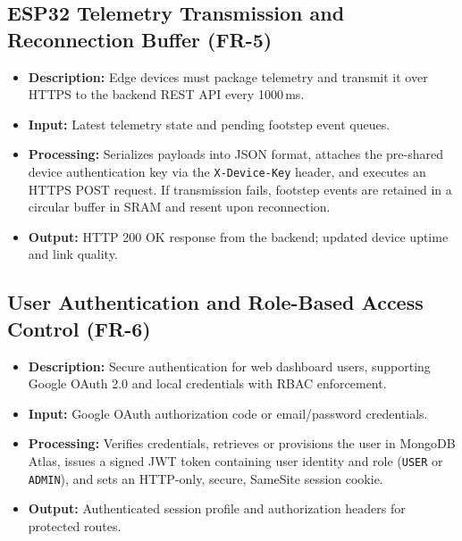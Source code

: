 \subsection{ESP32 Telemetry Transmission and Reconnection Buffer (FR-5)}
\begin{itemize}
    \item \textbf{Description:} Edge devices must package telemetry and transmit it over HTTPS to the backend REST API every 1000\,ms.
    \item \textbf{Input:} Latest telemetry state and pending footstep event queues.
    \item \textbf{Processing:} Serializes payloads into JSON format, attaches the pre-shared device authentication key via the \texttt{X-Device-Key} header, and executes an HTTPS POST request. If transmission fails, footstep events are retained in a circular buffer in SRAM and resent upon reconnection.
    \item \textbf{Output:} HTTP 200 OK response from the backend; updated device uptime and link quality.
\end{itemize}

\subsection{User Authentication and Role-Based Access Control (FR-6)}
\begin{itemize}
    \item \textbf{Description:} Secure authentication for web dashboard users, supporting Google OAuth 2.0 and local credentials with RBAC enforcement.
    \item \textbf{Input:} Google OAuth authorization code or email/password credentials.
    \item \textbf{Processing:} Verifies credentials, retrieves or provisions the user in MongoDB Atlas, issues a signed JWT token containing user identity and role (\texttt{USER} or \texttt{ADMIN}), and sets an HTTP-only, secure, SameSite session cookie.
    \item \textbf{Output:} Authenticated session profile and authorization headers for protected routes.
\end{itemize}

